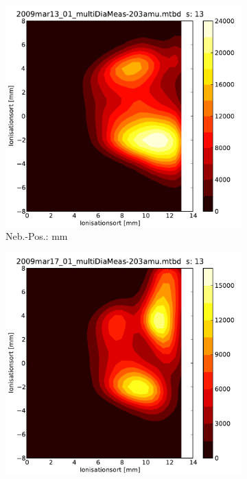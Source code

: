 \begin{figure}
	\begin{center}
   		\begin{subfigure}{0.45\columnwidth}
   			\includegraphics[width=1\columnwidth]{images/nebuPos_01_2000_50_2l_1_9mm.pdf} 
			\caption{Neb.-Pos.: \unit[17,7]{mm}}
			\label{nebuPos_01_17.7}
		\end{subfigure}
		\begin{subfigure}{0.45\columnwidth}
   			\includegraphics[width=1\columnwidth]{images/nebuPos_01_2000_50_2l_4_2mm.pdf} 

\end{subfigure}
\end{center}
\end{figure}
